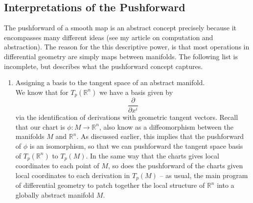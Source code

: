 \documentclass[12pt,letterpaper,boxed]{article}
\newcommand{\R}{{\mathbb{R}}}
\begin{document}
\subsection{Interpretations of the Pushforward}
The pushforward of a smooth map is an abstract concept precisely because it encompasses many different ideas (see my article on computation and abstraction). The reason for the this descriptive power, is that most operations in differential geometry are simply maps between manifolds. The following list is incomplete, but describes what the pushforward concept captures.
\begin{enumerate}
	\item Assigning a basis to the tangent space of an abstract manifold.\\

	We know that for $T_p(\R^n)$ we have a basis given by
	\[
		\frac{\partial }{\partial x^i}
	\]
	via the identification of derivations with geometric tangent vectors. Recall that our chart is $\phi  : M \to \R^n$, also know as a diffeomorphism between the manifolds $M$ and $\R^n$. As discussed earlier, this implies that the pushforward of $\phi$ is an isomorphism, so that we can pushforward the tangent space basis of $T_p(\R^n)$ to $T_p(M)$. In the same way that the charts gives local coordinates to each point of $M$, so does the pushforward of the charts given local coordinates to each derivation in $T_p(M)$ -- as usual, the main program of differential geometry to patch together the local structure of $\R^n$ into a globally abstract manifold $M$. 


\end{enumerate}
\end{document}
